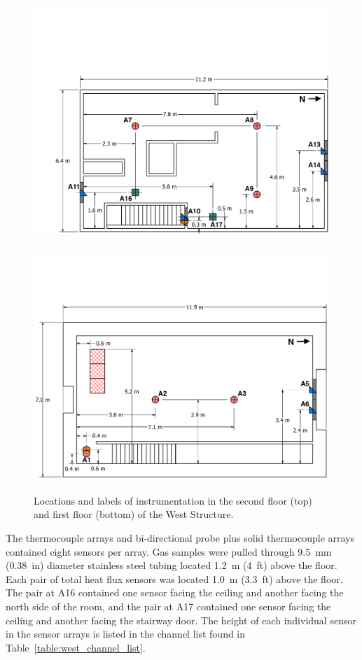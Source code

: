\begin{figure}
	\centering
	\includegraphics[width=0.94\columnwidth]{Figures/Floor_Plans/West_Structure_2nd_Floor_Dimensioned_Instrumentation}
	\\~\\
	\includegraphics[width=\columnwidth]{Figures/Floor_Plans/West_Structure_1st_Floor_Dimensioned_Instrumentation}
	\caption[Locations and labels of instrumentation in the West Structure]{Locations and labels of instrumentation in the second floor (top) and first floor (bottom) of the West Structure.}
	\label{fig:west_instrumentation}
\end{figure}

The thermocouple arrays and bi-directional probe plus solid thermocouple arrays contained eight sensors per array. Gas samples were pulled through 9.5~mm (0.38~in) diameter stainless steel tubing located 1.2~m (4~ft) above the floor. Each pair of total heat flux sensors was located 1.0~m (3.3~ft) above the floor. The pair at A16 contained one sensor facing the ceiling and another facing the north side of the room, and the pair at A17 contained one sensor facing the ceiling and another facing the stairway door. The height of each individual sensor in the sensor arrays is listed in the channel list found in Table~\ref{table:west_channel_list}.
\FloatBarrier

